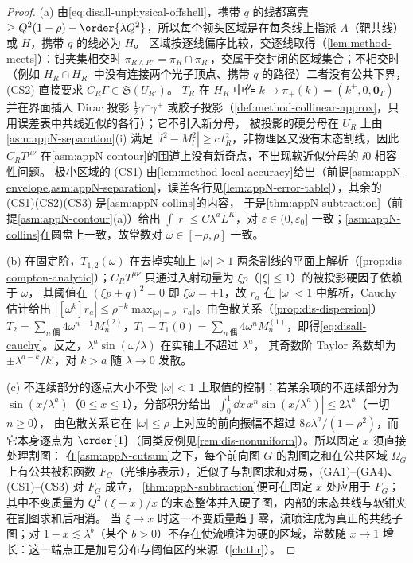\begin{proof}
(a) 由\cref{eq:disall-unphysical-offshell}，携带 $q$ 的线都离壳 $\ge Q^2(1-\rho)-\order{\lambda Q^2}$，所以每个领头区域是在每条线上指派 $A$（靶共线）或 $H$，携带 $q$ 的线必为 $H$。
区域按逐线偏序比较，交逐线取得（\cref{lem:method-meets}）：钳夹集相交时 $\pi_{R\wedge R'}=\pi_R\cap\pi_{R'}$，交属于交封闭的区域集合；不相交时（例如 $H_R\cap H_{R'}$ 中没有连接两个光子顶点、携带 $q$ 的路径）二者没有公共下界，(CS2) 直接要求 $C_R\Gamma\in\mathfrak S(U_{R'})$。
$T_R$ 在 $H_R$ 中作 $k\to\pi_+(k)=(k^+,0,\mathbf 0_T)$ 并在界面插入 Dirac 投影 $\frac12\gamma^-\gamma^+$ 或胶子投影（\cref{def:method-collinear-approx}，只用误差表中共线近似的各行）；它不引入新分母，
被投影的硬分母在 $U_R$ 上由\cref{asm:appN-separation}(i) 满足 $|l^2-M_l^2|\ge c\,t_R^2$，非物理区又没有末态割线，因此 $C_RT^{\mu\nu}$ 在\cref{asm:appN-contour}的围道上没有新奇点，不出现软近似分母的 $\ii0$ 相容性问题。
极小区域的 (CS1) 由\cref{lem:method-local-accuracy}给出（前提\cref{asm:appN-envelope,asm:appN-separation}，误差各行见\cref{lem:appN-error-table}），其余的 (CS1)(CS2)(CS3) 是\cref{asm:appN-collins}的内容，
于是\cref{thm:appN-subtraction}（前提\cref{asm:appN-contour}(a)）给出 $\int|r|\le C\lambda^aL^K$，对 $\varepsilon\in(0,\varepsilon_0]$ 一致；\cref{asm:appN-collins}在圆盘上一致，故常数对 $\omega\in[-\rho,\rho]$ 一致。

(b) 在固定阶，$T_{1,2}(\omega)$ 在去掉实轴上 $|\omega|\ge1$ 两条割线的平面上解析（\cref{prop:dis-compton-analytic}）；$C_RT^{\mu\nu}$ 只通过入射动量为 $\xi p$（$|\xi|\le1$）的被投影硬因子依赖于 $\omega$，
其阈值在 $(\xi p\pm q)^2=0$ 即 $\xi\omega=\pm1$，故 $r_a$ 在 $|\omega|<1$ 中解析，Cauchy 估计给出 $|[\omega^k]r_a|\le\rho^{-k}\max_{|\omega|=\rho}|r_a|$。由色散关系（\cref{prop:dis-dispersion}）
$T_2=\sum_{n\ \text{偶}}4\omega^{n-1}M^{(2)}_n$，$T_1-T_1(0)=\sum_{n\ \text{偶}}4\omega^nM^{(1)}_n$，即得\cref{eq:disall-cauchy}。反之，$\lambda^a\sin(\omega/\lambda)$ 在实轴上不超过 $\lambda^a$，
其奇数阶 Taylor 系数却为 $\pm\lambda^{a-k}/k!$，对 $k>a$ 随 $\lambda\to0$ 发散。

(c) 不连续部分的逐点大小不受 $|\omega|<1$ 上取值的控制：若某余项的不连续部分为 $\sin(x/\lambda^a)$（$0\le x\le1$），分部积分给出 $|\int_0^1\dd x\,x^n\sin(x/\lambda^a)|\le2\lambda^a$（一切 $n\ge0$），
由色散关系它在 $|\omega|\le\rho$ 上对应的前向振幅不超过 $8\rho\lambda^a/(1-\rho^2)$，而它本身逐点为 $\order{1}$（同类反例见\cref{rem:dis-nonuniform}）。所以固定 $x$ 须直接处理割图：
在\cref{asm:appN-cutsum}之下，每个前向图 $G$ 的割图之和在公共区域 $\Omega_G$ 上有公共被积函数 $F_G$（光锥序表示），近似子与割图求和对易，(GA1)–(GA4)、(CS1)–(CS3) 对 $F_G$ 成立，
\cref{thm:appN-subtraction}便可在固定 $x$ 处应用于 $F_G$；其中不变质量为 $Q^2(\xi-x)/x$ 的末态整体并入硬子图，内部的末态共线与软钳夹在割图求和后相消。
当 $\xi\to x$ 时这一不变质量趋于零，流喷注成为真正的共线子图；对 $1-x\lesssim\lambda^b$（某个 $b>0$）不存在使流喷注为硬的区域，常数随 $x\to1$ 增长：这一端点正是加号分布与阈值区的来源（\cref{ch:thr}）。
\end{proof}

